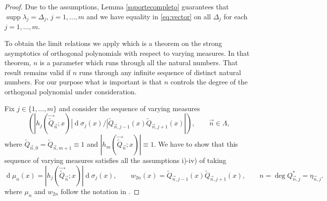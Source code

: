\documentclass{amsart}
\numberwithin{equation}{section}
\theoremstyle{definition}
\DeclareMathOperator{\D}{d}        %
\DeclareMathOperator{\supp}{supp}  %
\newcommand{\n}{\vec{n}}          %
\begin{document}
    \begin{proof} Due to the assumptions, Lemma \ref{soportecompleto} guarantees that $\supp \lambda_j = \Delta_j$, $j=1,\ldots,m$ and we have equality in \eqref{eq:vector} on all $\Delta_j $ for each $j=1,\ldots,m$.

     To obtain the limit relations we apply \cite[Th. 1.2]{LGLago} which is a theorem on the strong asymptotics of orthogonal polynomials with respect to varying measures. In that theorem, $n$ is a parameter which runs through all the natural numbers. That result remains valid if $n$ runs through any infinite sequence of distinct natural numbers. For our purpose what is important is that $n$ controls the degree of the orthogonal polynomial under consideration.	

    Fix $j  \in \{1,\ldots,m\}$ and consider the sequence of varying measures
    \[ (| { {h}_{j}( {\vec{\tilde{Q}}_{\n}};x)| \D\sigma_{j}(x)/ |\tilde{Q}_{\n,j-1}(x) \tilde{Q}_{\n,j+1}(x)}|), \qquad \n \in \Lambda,
    \]
    where $\tilde{Q}_{\n,0} = \tilde{Q}_{\n,m+1} \equiv 1$ and $| {h}_{m}( {\vec{\tilde{Q}}_{\n}};x)| \equiv 1 $.
    We have to show that this sequence of varying measures satisfies all the assumptions i)-iv) of \cite[Th. 1.2]{LGLago} taking
   \[ \D \mu_n(x) = | {h}_{j}( {\vec{\tilde{Q}}_{\n}};x)| \D\sigma_{j}(x), \qquad w_{2n}(x) = \tilde{Q}_{\n,j-1}(x) \tilde{Q}_{\n,j+1}(x), \qquad n = \deg Q_{\n,j}^* = \eta_{\n,j}.
   \]
   where $\mu_n$ and $ w_{2n}$ follow the notation in \cite{LGLago}.


\end{proof}
\end{document}

